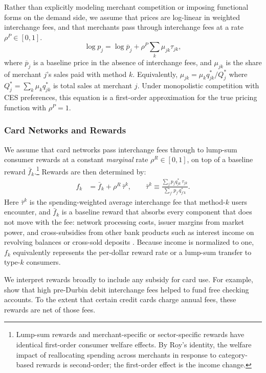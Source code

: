 \documentclass[main.tex]{subfiles}
\begin{document}
Rather than explicitly modeling merchant competition or imposing functional forms on the demand side, we assume that prices are log-linear in weighted interchange fees, and that merchants pass through interchange fees at a rate $\rho^P\in[0,1]$.
\begin{equation}
\log p_{j}=\log\overline{p}_{j}+\rho^P\sum_{k}\mu_{jk}\tau_{jk},\label{eq:retail-price-pass}
\end{equation}
where $\overline{p}_j$ is a baseline price in the absence of interchange fees, and $\mu_{jk}$ is the share of merchant $j$'s sales paid with method $k$. Equivalently, $\mu_{jk}=\mu_k q_{jk}^{*}/Q_{j}^{*}$ where $Q_{j}^{*}=\sum_{k}\mu_k q_{jk}^{*}$ is total sales at merchant $j$.
Under monopolistic competition with CES preferences, this equation is a first-order approximation for the true pricing function with $\rho^P=1$.

\subsubsection{Card Networks and Rewards}
We assume that card networks pass interchange fees through to lump-sum consumer rewards at a constant \emph{marginal} rate $\rho^R\in[0,1]$, on top of a baseline reward $\bar f_k$.\footnote{Lump-sum rewards and merchant-specific or sector-specific rewards have identical first-order consumer welfare effects.
By Roy's identity, the welfare impact of reallocating spending across merchants in response to category-based rewards is second-order; the first-order effect is the income change. }
Rewards are then determined by:
\begin{align}
f_{k} & =\bar f_{k}+\rho^R\,\bar\tau^{k},
\qquad
\bar\tau^{k}\equiv\frac{\sum_{j}p_{j}q_{jk}^{*}\,\tau_{jk}}{\sum_{j'}p_{j'}q_{j'k}^{*}}.
\label{eq:reward-pass-through}
\end{align}
Here $\bar\tau^{k}$ is the spending-weighted average interchange fee that method-$k$ users encounter, and $\bar f_k$ is a baseline reward that absorbs every component that does not move with the fee: network processing costs, issuer margins from market power, and cross-subsidies from other bank products such as interest income on revolving balances \citep{Agarwal.etal2025, Agarwal.etal2026} or cross-sold deposits \citep{Brown.McDonald2026}.
Because income is normalized to one, $f_k$ equivalently represents the per-dollar reward rate or a lump-sum transfer to type-$k$ consumers.

We interpret rewards broadly to include any subsidy for card use.
For example, \citet{Kay.etal2018, Mukharlyamov.Sarin2025} show that high pre-Durbin debit interchange fees helped to fund free checking accounts.
To the extent that certain credit cards charge annual fees, these rewards are net of those fees.
\end{document}

